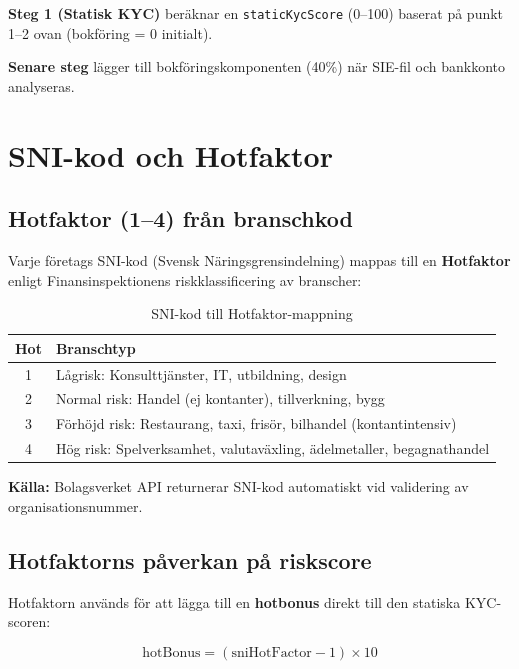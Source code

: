 \documentclass[12pt,a4paper]{article}
\begin{document}
\textbf{Steg 1 (Statisk KYC)} beräknar en \texttt{staticKycScore} (0–100) baserat på punkt 1–2 ovan (bokföring = 0 initialt).

\textbf{Senare steg} lägger till bokföringskomponenten (40\%) när SIE-fil och bankkonto analyseras.

\section{SNI-kod och Hotfaktor}

\subsection{Hotfaktor (1–4) från branschkod}

Varje företags SNI-kod (Svensk Näringsgrensindelning) mappas till en \textbf{Hotfaktor} enligt Finansinspektionens riskklassificering av branscher:

\begin{table}[h]
\centering
\begin{tabular}{cl}
\toprule
\textbf{Hot} & \textbf{Branschtyp} \\
\midrule
1 & Lågrisk: Konsulttjänster, IT, utbildning, design \\
2 & Normal risk: Handel (ej kontanter), tillverkning, bygg \\
3 & Förhöjd risk: Restaurang, taxi, frisör, bilhandel (kontantintensiv) \\
4 & Hög risk: Spelverksamhet, valutaväxling, ädelmetaller, begagnathandel \\
\bottomrule
\end{tabular}
\caption{SNI-kod till Hotfaktor-mappning}
\end{table}

\textbf{Källa:} Bolagsverket API returnerar SNI-kod automatiskt vid validering av organisationsnummer.

\subsection{Hotfaktorns påverkan på riskscore}

Hotfaktorn används för att lägga till en \textbf{hotbonus} direkt till den statiska KYC-scoren:

\begin{equation}
\text{hotBonus} = (\text{sniHotFactor} - 1) \times 10
\end{equation}
\end{document}
